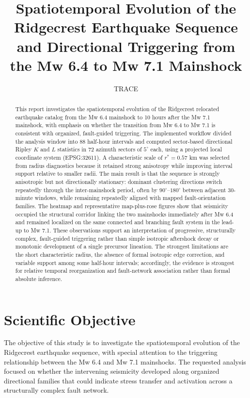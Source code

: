 \documentclass[11pt]{article}
\title{Spatiotemporal Evolution of the Ridgecrest Earthquake Sequence and Directional Triggering from the Mw 6.4 to Mw 7.1 Mainshock}
\author{TRACE}
\date{}
\begin{document}
\maketitle

\begin{abstract}
This report investigates the spatiotemporal evolution of the Ridgecrest relocated earthquake catalog from the Mw 6.4 mainshock to 10 hours after the Mw 7.1 mainshock, with emphasis on whether the transition from Mw 6.4 to Mw 7.1 is consistent with organized, fault-guided triggering. The implemented workflow divided the analysis window into 88 half-hour intervals and computed sector-based directional Ripley $K$ and $L$ statistics in 72 azimuth sectors of $5^{\circ}$ each, using a projected local coordinate system (EPSG:32611). A characteristic scale of $r^{\ast}=0.57$ km was selected from radius diagnostics because it retained strong anisotropy while improving interval support relative to smaller radii. The main result is that the sequence is strongly anisotropic but not directionally stationary: dominant clustering directions switch repeatedly through the inter-mainshock period, often by $90^{\circ}$--$180^{\circ}$ between adjacent 30-minute windows, while remaining repeatedly aligned with mapped fault-orientation families. The heatmap and representative map-plus-rose figures show that seismicity occupied the structural corridor linking the two mainshocks immediately after Mw 6.4 and remained localized on the same connected and branching fault system in the lead-up to Mw 7.1. These observations support an interpretation of progressive, structurally complex, fault-guided triggering rather than simple isotropic aftershock decay or monotonic development of a single precursor lineation. The strongest limitations are the short characteristic radius, the absence of formal isotropic edge correction, and variable support among some half-hour intervals; accordingly, the evidence is strongest for relative temporal reorganization and fault-network association rather than formal absolute inference.
\end{abstract}

\section{Scientific Objective}
The objective of this study is to investigate the spatiotemporal evolution of the Ridgecrest earthquake sequence, with special attention to the triggering relationship between the Mw 6.4 and Mw 7.1 mainshocks. The requested analysis focused on whether the intervening seismicity developed along organized directional families that could indicate stress transfer and activation across a structurally complex fault network.
\end{document}
